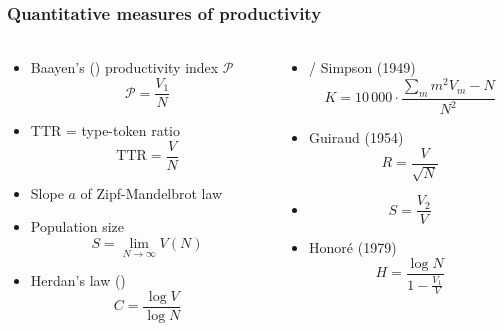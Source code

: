 \documentclass[t]{beamer} %
\begin{document}
\begin{frame}
  \frametitle{Quantitative measures of productivity}
  \framesubtitle{\citep{Tweedie:Baayen:98,Baayen:01}}

  \footnotesize
  \begin{columns}[c]
        \begin{column}{6cm}
      \ungap[1.2]
      \begin{itemize}
      \item Baayen's (\citeyear{Baayen:91}) productivity index $\mathcal{P}$
        \[
        \mathcal{P} = \frac{V_1}{N}
        \]
      \item TTR = type-token ratio
        \[
        \text{TTR} = \frac{V}{N}
        \]
      \item Slope $a$ of Zipf-Mandelbrot law
      \item Population size
        \[
        S = \lim_{N \to \infty} V(N)
        \]
      \item Herdan's law (\citeyear{Herdan:64})
        \[
        C = \frac{\log V}{\log N}
        \]
      \end{itemize}
    \end{column}
    \begin{column}{6cm}
      \begin{itemize}
      \item<2-> \citet{Yule:44} /  Simpson (1949) 
        \[
          K = 10\,000\cdot \frac{\sum_m m^2 V_m - N}{N^2}
        \]
      \item<2-> Guiraud (1954)
        \[
          R = \frac{V}{\sqrt{N}}
        \]
      \item<2-> \citet{Sichel:75}
        \[
          S = \frac{V_2}{V}
        \]
      \item<2-> Honoré (1979)
        \[
          H = \frac{\log N}{1 - \frac{V_1}{V}}
        \]
      \end{itemize}
    \end{column}
  \end{columns}  
\end{frame}
\end{document}
